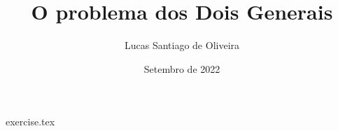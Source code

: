 \documentclass{article}
\title{O problema dos Dois Generais}
\author{Lucas Santiago de Oliveira}
\date{Setembro de 2022}
\begin{document}
    \maketitle

    {exercise.tex}
\end{document}
